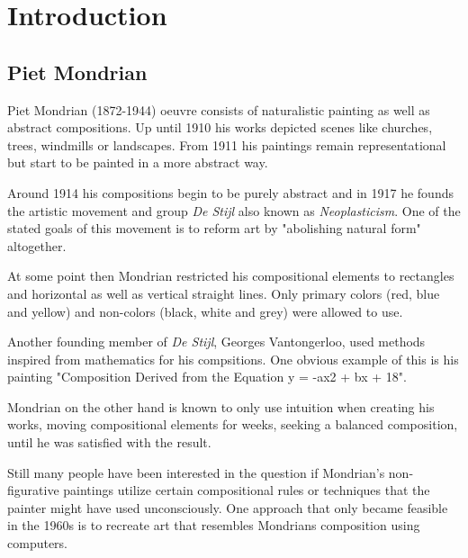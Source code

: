 \section{Introduction}

\subsection{Piet Mondrian}

Piet Mondrian (1872-1944) oeuvre consists of naturalistic painting as well
as abstract compositions. Up until 1910 his works depicted scenes like
churches, trees, windmills or landscapes. From 1911 his paintings
remain representational but start to be painted in a more abstract way.

Around 1914 his compositions begin to be purely abstract and in 1917 he founds
the artistic movement and group \textit{De Stijl} also known as
\textit{Neoplasticism}. One of the stated goals of this movement is to reform
art by "abolishing natural form" \cite{wiki:manifest} altogether.


At some point then Mondrian restricted his compositional elements to rectangles
and horizontal as well as vertical straight lines. Only primary colors (red,
blue and yellow) and non-colors (black, white and grey) were allowed to use.

Another founding member of \textit{De Stijl}, Georges Vantongerloo, used methods
inspired from mathematics for his compsitions. One obvious example of this is
his painting "Composition Derived from the Equation y = -ax2 + bx + 18".

Mondrian on the other hand is known to only use intuition when creating his
works, moving compositional elements for weeks, seeking a balanced composition,
until he was satisfied with the result.

Still many people have been interested in the question if Mondrian's
non-figurative paintings utilize certain compositional rules or techniques that
the painter might have used unconsciously. One approach that only became
feasible in the 1960s is to recreate art that resembles Mondrians composition
using computers.

